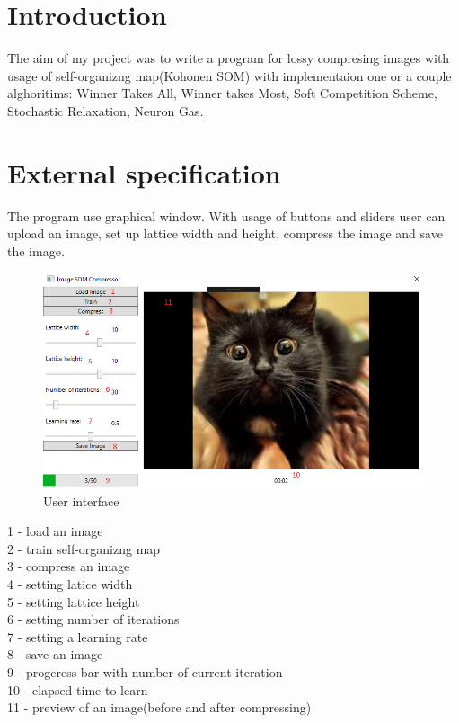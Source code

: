 \documentclass[12pt,a4paper]{article}
\begin{document}
\section{Introduction}
The aim of my project was to write a program for lossy compresing images with usage of self-organizng map(Kohonen SOM) with implementaion one or a couple alghoritims: Winner Takes All, Winner takes Most, Soft Competition Scheme, Stochastic Relaxation, Neuron Gas.

\section{External specification}
The program use graphical window. With usage of buttons and sliders user can upload an image, set up lattice width and height, compress the image and save the image.

\begin{figure}[H]
\centering
\includegraphics[width=\textwidth]{images/userInterface}
\caption{User interface}
\end{figure}

1 - load an image\\
2 - train self-organizng map\\
3 - compress an image\\
4 - setting latice width\\
5 - setting lattice height\\
6 - setting number of iterations\\
7 - setting a learning rate\\
8 - save an image\\
9 - progeress bar with number of current iteration\\
10 - elapsed time to learn\\
11 - preview of an image(before and after compressing)\\
\end{document}
